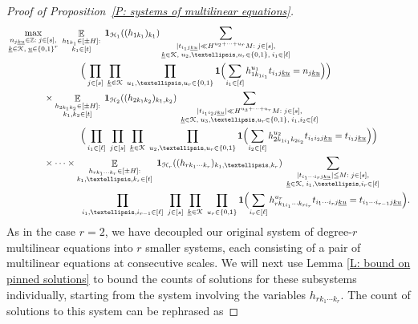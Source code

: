 \documentclass[11pt]{amsart}
\theoremstyle{definition}
\DeclareMathOperator*{\E}{\mathbb{E}}
\newcommand{\Z}{{\mathbb Z}}
\newcommand{\CH}{{\mathcal H}}
\newcommand{\CK}{{\mathcal K}}
\newcommand{\uk}{{\underline{k}}}
\newcommand{\uu}{{\underline{u}}}
\newcommand{\Bigbrac}[1]{\Bigl( #1 \Bigr)}
\begin{document}
\begin{proof}[Proof of Proposition~\ref{P: systems of multilinear equations}]
\begin{align*}
            &\max_{\substack{n_{j\uk\uu}\in\Z:\; j\in[s],\\ \uk\in\CK,\; \uu\in\{0,1\}^r}}\; \E_{\substack{h_{1k_1}\in[\pm H]:\\ k_1\in[t]}}\; \mathbf{1}_{\CH_1}((h_{1 k_1})_{k_1})\sum_{\substack{|t_{i_1 j\uk\uu}|\ll H^{u_2+\cdots +u_r}M:\; j\in[s],\\ \uk\in\CK,\; u_2, \ldots, u_r\in\{0,1\},\; i_1\in[\ell]}}\\
        &\qquad\qquad\qquad\qquad\Big(\prod_{j\in[s]}\; \prod_{\substack{\uk\in\CK}}\; \prod_{\substack{u_1, \ldots, u_r\in\{0,1\}}}\mathbf{1}\Bigbrac{\sum\limits_{i_1\in[\ell]} h_{1k_{1i_1}}^{u_1} t_{i_1 j\uk\uu}= n_{j\uk\uu}}\Big)
        \\
        &\qquad\qquad\times \E_{\substack{h_{2k_1k_2}\in[\pm H]:\\ k_1,k_2\in[t]}}\; \mathbf{1}_{\CH_2}((h_{2 k_1 k_2})_{k_1, k_2})\; \sum_{\substack{|t_{i_1i_2 j\uk\uu}|\ll H^{u_3+\cdots+u_r}M:\; j\in[s],\\ \uk\in\CK,\; u_3, \ldots, u_r\in\{0,1\},\; i_1, i_2\in[\ell]}}\\
        &\qquad\qquad\qquad\qquad
        \Big(\prod_{i_1\in[\ell]}\; \prod_{j\in[s]}\; \prod_{\substack{\uk\in\CK}}\; \prod_{\substack{u_2, \ldots, u_r\in\{0,1\}}} \mathbf{1}\Bigbrac{\sum\limits_{i_2\in[\ell]} h_{2k_{1i_1}k_{2i_2}}^{u_2}t_{i_1 i_2 j\uk\uu} = t_{i_1 j\uk\uu}}\Big)\\
        &\qquad\qquad\times \cdots \times \E_{\substack{h_{rk_1\cdots k_r}\in[\pm H]:\\ k_1,\ldots, k_r\in[t]}}\; \mathbf{1}_{\CH_r}((h_{r k_1 \cdots k_r})_{k_1, \ldots, k_r})\; \sum_{\substack{|t_{i_1\cdots i_r j\uk\uu}|\leq M:\; j\in[s],\\ \uk\in\CK,\; i_1,\ldots,i_r\in[\ell]}}   \\
        &\qquad\qquad\qquad\qquad
        \prod_{i_1,\ldots, i_{r-1}\in[\ell]}\; \prod_{j\in[s]}\; \prod_{\substack{\uk\in\CK}}\; \prod_{\substack{u_r\in\{0,1\}}}
         \mathbf{1}\Bigbrac{\sum\limits_{i_r\in[\ell]} h_{rk_{1i_1}\cdots k_{r i_r}}^{u_r}t_{i_1 \cdots i_r j\uk\uu} = t_{i_1 \cdots i_{r-1} j\uk\uu}}.
\end{align*}
    As in the case $r=2$, we have decoupled our original system of degree-$r$ multilinear equations into $r$ smaller systems, each consisting of a pair of multilinear equations at consecutive scales.  We will next use Lemma \ref{L: bound on pinned solutions} to bound the counts of solutions for these subsystems individually, starting from the system involving the variables $h_{rk_1\cdots k_r}$. The count of solutions to this system can be rephrased as

\end{proof}
\end{document}
